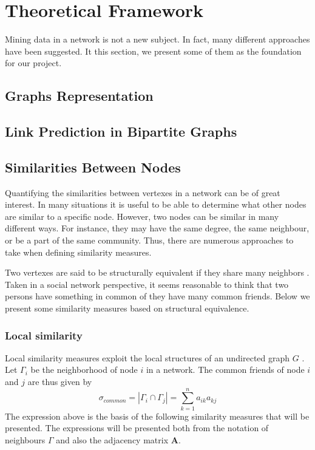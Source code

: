 \chapter{Theoretical Framework}
Mining data in a network is not a new subject. In fact, many different approaches have been suggested. It this section, we present some of them as the foundation for our project.

\section{Graphs Representation}


\section{Link Prediction in Bipartite Graphs}


\section{Similarities Between Nodes \label{sim}}
Quantifying the similarities between vertexes in a network can be of great interest. In many situations it is useful to be able to determine what other nodes are similar to a specific node. However, two nodes can be similar in many different ways. For instance, they may have the same degree, the same neighbour, or be a part of the same community. Thus, there are numerous approaches to take when defining similarity measures.

Two vertexes are said to be structurally equivalent if they share many neighbors \cite{leicht2006}. Taken in a social network perspective, it seems reasonable to think that two persons have something in common of they have many common friends. Below we present some similarity measures based on structural equivalence.

\subsection{Local similarity}
Local similarity measures exploit the local structures of an undirected graph $G$ \cite{fouss2016algorithms}. Let $\Gamma_i$ be the neighborhood of node $i$ in a network. The common friends of node $i$ and $j$ are thus given by
\begin{equation}
\label{common}
\sigma_{common} = |\Gamma_i \cap \Gamma_j| = \sum_{k=1}^n a_{ik}a_{kj}
\end{equation}
The expression above is the basis of the following similarity measures that will be presented. The expressions will be presented both from the notation of neighbours $\Gamma$ and also the adjacency matrix $\textbf{A}$.

